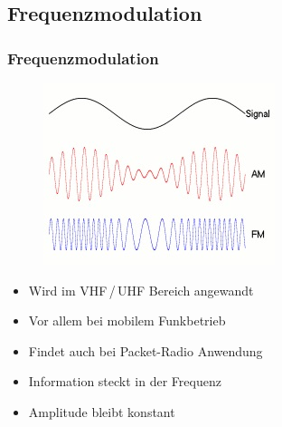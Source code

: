 \subsection[FM]{Frequenzmodulation}
\begin{frame}
  \frametitle{Frequenzmodulation}
  \begin{center}
    \begin{figure}
      \includegraphics[width=\textwidth,height=.4\textheight,keepaspectratio]{e14/modulationen.jpg}
    \end{figure}
    \begin{itemize}
      \item Wird im VHF\,/\,UHF Bereich angewandt
      \item Vor allem bei mobilem Funkbetrieb
      \item Findet auch bei Packet-Radio Anwendung
      \item Information steckt in der Frequenz
      \item Amplitude bleibt konstant
    \end{itemize}
  \end{center}
\end{frame}

